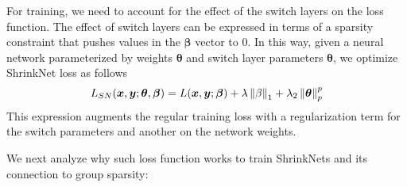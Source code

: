 For training, we need to account for the effect of the switch layers on the loss
function. The effect of switch layers can be expressed in terms of a sparsity constraint
that pushes values in the $\bm{\beta}$ vector to 0. In this way, given a neural network
parameterized by weights $\bm{\theta}$ and switch layer parameters $\bm{\theta}$, we
optimize ShrinkNet loss as follows 
\begin{equation}
\small
  L_{SN}(\bm{x},\bm{y};\bm{\theta}, \bm{\beta}) = L(\bm{x}, \bm{y}; \bm{\beta}) +
  \lambda\norm{\beta}_1 + \lambda_2\norm{\bm{\theta}}_p^p
\end{equation}
This expression augments the regular training loss with a regularization
term for the switch parameters and another on the network weights.

We next analyze why such loss function works to train ShrinkNets and its
connection to group sparsity:







